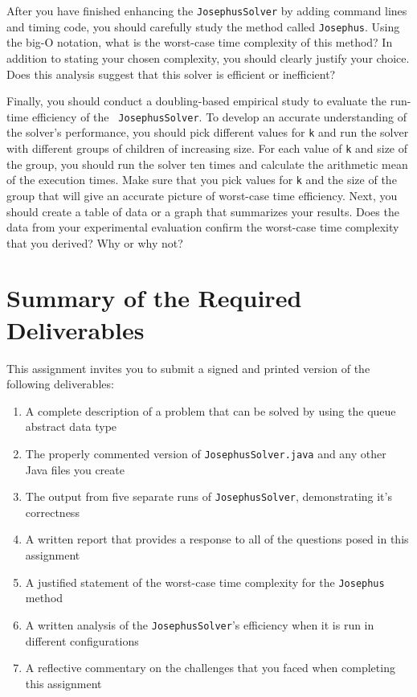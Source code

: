   After you have finished enhancing the {\tt JosephusSolver} by adding command lines and timing code, you should
  carefully study the method called {\tt Josephus}.  Using the big-O notation, what is the worst-case time complexity of
  this method?  In addition to stating your chosen complexity, you should clearly justify your choice. Does this
  analysis suggest that this solver is efficient or inefficient?

  Finally, you should conduct a doubling-based empirical study to evaluate the run-time efficiency of the {\tt
  JosephusSolver}.  To develop an accurate understanding of the solver's performance, you should pick different values
  for {\tt k} and run the solver with different groups of children of increasing size. For each value of {\tt k} and
  size of the group, you should run the solver ten times and calculate the arithmetic mean of the execution times. Make
  sure that you pick values for {\tt k} and the size of the group that will give an accurate picture of worst-case time
  efficiency. Next, you should create a table of data or a graph that summarizes your results. Does the data from your
  experimental evaluation confirm the worst-case time complexity that you derived? Why or why not?

\section*{Summary of the Required Deliverables}

  This assignment invites you to submit a signed and printed version of the following deliverables:

  \begin{enumerate}

  \item A complete description of a problem that can be solved by using the queue abstract data type

  \item The properly commented version of {\tt JosephusSolver.java} and any other Java files you create

  \item The output from five separate runs of {\tt JosephusSolver}, demonstrating it's correctness

  \item A written report that provides a response to all of the questions posed in this assignment

  \item A justified statement of the worst-case time complexity for the {\tt Josephus} method

  \item A written analysis of the {\tt JosephusSolver}'s efficiency when it is run in different configurations

  \item A reflective commentary on the challenges that you faced when completing this assignment

  \end{enumerate}

